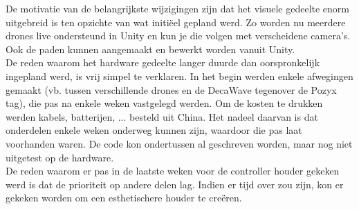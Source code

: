 De motivatie van de belangrijkste wijzigingen zijn dat het visuele gedeelte enorm uitgebreid is ten opzichte van wat initi\"eel gepland werd. Zo worden nu meerdere drones live ondersteund in Unity en kun je die volgen met verscheidene camera's. Ook de paden kunnen aangemaakt en bewerkt worden vanuit Unity. \\
De reden waarom het hardware gedeelte langer duurde dan oorspronkelijk ingepland werd, is vrij simpel te verklaren.
In het begin werden enkele afwegingen gemaakt (vb. tussen verschillende drones en de DecaWave tegenover de Pozyx tag), die pas na enkele weken vastgelegd werden.
Om de kosten te drukken werden kabels, batterijen, ... besteld uit China. Het nadeel daarvan is dat onderdelen enkele weken onderweg kunnen zijn, waardoor die pas laat voorhanden waren. De code kon ondertussen al geschreven worden, maar nog niet uitgetest op de hardware.\\
De reden waarom er pas in de laatste weken voor de controller houder gekeken werd is dat de prioriteit op andere delen lag. Indien er tijd over zou zijn, kon er gekeken worden om een esthetischere houder te cre\"eren.
